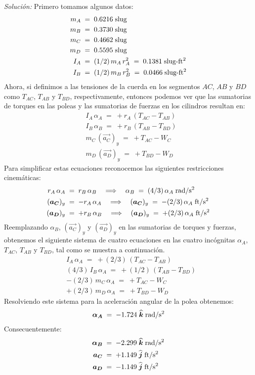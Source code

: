 \documentclass[ a4paper, twoside, 11pt]{article}
\begin{document}
\begin{problem}
\emph{Soluci\'on:} Primero tomamos algunos datos: 
\begin{align*}
m_A \; & = \; 0.6216 \; \text{slug} \\
m_B \; & = \; 0.3730 \; \text{slug} \\
m_C \; & = \; 0.4662 \; \text{slug} \\
m_D \; & = \; 0.5595 \; \text{slug} \\
I_A \; & = \; (1/2) \, m_A \, r_A^2 \; = \; 0.1381 \; \text{slug-ft\ensuremath{^{\text{2}}}} \\
I_B \; & = \; (1/2) \, m_B \, r_B^2 \; = \; 0.0466 \; \text{slug-ft\ensuremath{^{\text{2}}}}
\end{align*}
Ahora, si definimos a las tensiones de la cuerda en los segmentos $AC$, $AB$ y $BD$ como $T_{AC}$, $T_{AB}$ y $T_{BD}$, respectivamente, entonces podemos ver que las sumatorias de torques en las poleas y las sumatorias de fuerzas en los cilindros resultan en: 
\begin{align*}
& I_A \, \alpha_A \; = \; +r_A \, ( T_{AC} - T_{AB} ) \\
& I_B \, \alpha_B \; = \; +r_B \, ( T_{AB} - T_{BD} ) \\
& m_C \, (\vec{a_C})_y \; = \; +T_{AC} - W_C \\
& m_D \, (\vec{a_D})_y \; = \; +T_{BD} - W_D
\end{align*}
Para simplificar estas ecuaciones reconocemos las siguientes restricciones cinem\'aticas: 
\begin{align*}
r_A \, \alpha_A \; & = \; r_B \, \alpha_B
\quad \Longrightarrow \quad
\alpha_B \; = \; (4/3) \, \alpha_A \; \text{rad/s\ensuremath{^{\text{2}}}} \\
({\boldsymbol{a_C}})_y \; & = \; -r_A \, \alpha_A
\quad \Longrightarrow \quad
({\boldsymbol{a_C}})_y \; = \; -(2/3) \, \alpha_A \; \text{ft/s\ensuremath{^{\text{2}}}} \\
({\boldsymbol{a_D}})_y \; & = \; +r_B \, \alpha_B
\quad \Longrightarrow \quad
({\boldsymbol{a_D}})_y \; = \; +(2/3) \, \alpha_A \; \text{ft/s\ensuremath{^{\text{2}}}}
\end{align*}
Reemplazando $\alpha_B$, $(\vec{a_C})_y$ y $(\vec{a_D})_y$ en las sumatorias de torques y fuerzas, obtenemos el siguiente sistema de cuatro ecuaciones en las cuatro inc\'ognitas $\alpha_A$, $T_{AC}$, $T_{AB}$ y $T_{BD}$, tal como se muestra a continuaci\'on. 
\begin{align*}
& I_A \, \alpha_A \; = \; +(2/3) \, ( T_{AC} - T_{AB} ) \\
& (4/3) \, I_B \, \alpha_A \; = \; +(1/2) \, ( T_{AB} - T_{BD} ) \\
& -(2/3) \, m_C \, \alpha_A \; = \; +T_{AC} - W_C \\
& +(2/3) \, m_D \, \alpha_A \; = \; +T_{BD} - W_D
\end{align*}
Resolviendo este sistema para la aceleraci\'on angular de la polea obtenemos: 
\[
{\boldsymbol{\alpha_A}} \; = \; -1.724 \; {\boldsymbol{\widehat{k}}} \; \text{rad/s\ensuremath{^{\text{2}}}}
\]
Consecuentemente: 
\begin{align*}
{\boldsymbol{\alpha_B}} \; & = \; -2.299 \; {\boldsymbol{\widehat{k}}} \; \text{rad/s\ensuremath{^{\text{2}}}} \\
{\boldsymbol{a_C}} \; & = \; +1.149 \; {\boldsymbol{\widehat{j}}} \; \text{ft/s\ensuremath{^{\text{2}}}} \\
{\boldsymbol{a_D}} \; & = \; -1.149 \; {\boldsymbol{\widehat{j}}} \; \text{ft/s\ensuremath{^{\text{2}}}}
\end{align*}
\QED


\end{problem}
\end{document}
